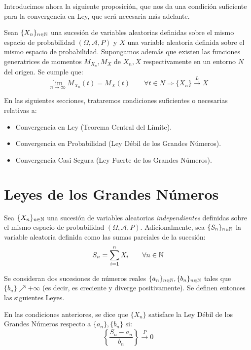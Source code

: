 Introducimos ahora la siguiente proposición, que nos da una condición suficiente para la convergencia en Ley, que será necesaria más adelante.
\begin{prop}
    Sean $\{X_n\}_{n\in \mathbb{N}}$ una sucesión de variables aleatorias definidas sobre el mismo espacio de probabilidad $(\Omega, \mathcal{A}, P)$ y $X$ una variable aleatoria definida sobre el mismo espacio de probabilidad. Supongamos además que existen las funciones generatrices de momentos $M_{X_n}, M_X$ de $X_n, X$ respectivamente en un entorno $N$ del origen. Se cumple que:
    \begin{equation*}
        \lim_{n\to \infty} M_{X_n}(t) = M_X(t) \qquad \forall t\in N
        \Longrightarrow \{X_n\} \xrightarrow{L} X
    \end{equation*}
\end{prop}

En las siguientes secciones, trataremos condiciones suficientes o necesarias relativas a:
\begin{itemize}
    \item Convergencia en Ley (Teorema Central del Límite).
    \item Convergencia en Probabilidad (Ley Débil de los Grandes Números).
    \item Convergencia Casi Segura (Ley Fuerte de los Grandes Números).
\end{itemize}

\section{Leyes de los Grandes Números}

Sea $\{X_n\}_{n\in \mathbb{N}}$ una sucesión de variables aleatorias \emph{independientes} definidas sobre el mismo espacio de probabilidad $(\Omega, \mathcal{A}, P)$. Adicionalmente, sea $\{S_n\}_{n\in \mathbb{N}}$ la variable aleatoria definida como las sumas parciales de la sucesión:
\begin{equation*}
    S_n = \sum_{i=1}^{n} X_i\qquad \forall n\in \mathbb{N}
\end{equation*}

Se consideran dos sucesiones de números reales $\{a_n\}_{n\in \mathbb{N}}, \{b_n\}_{n\in \mathbb{N}}$ tales que $\{b_n\}\nearrow
+\infty$ (es decir, es creciente y diverge positivamente). Se definen entonces las siguientes Leyes.
\begin{definicion}
    En las condiciones anteriores, se dice que $\{X_n\}$ satisface la Ley Débil de los Grandes Números respecto a $\{a_n\}, \{b_n\}$ si:
    \begin{equation*}
        \left\{\frac{S_n - a_n}{b_n}\right\} \xrightarrow{P} 0
    \end{equation*}
\end{definicion}

